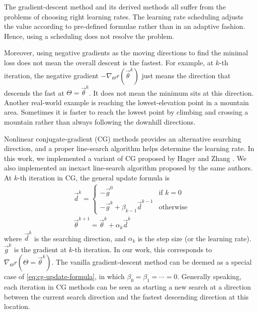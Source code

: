 
The gradient-descent method and its derived methods all suffer from the problems of choosing right learning rates.
The learning rate scheduling adjusts the value according to pre-defined formulae rather than in an adaptive fashion.
Hence, using a scheduling does not resolve the problem.

Moreover, using negative gradients as the moving directions to find the minimal loss does not mean the overall descent is the fastest.
For example, at $k$-th iteration, the negative gradient $- \nabla_{\Theta} r(\vec{\theta}^k)$ just means the direction that descends the fast at $\Theta=\vec{\theta}^k$.
It does not mean the minimum sits at this direction.
Another real-world example is reaching the lowest-elevation point in a mountain area.
Sometimes it is faster to reach the lowest point by climbing and crossing a mountain rather than always following the downhill directions.

Nonlinear conjugate-gradient (CG) methods provides an alternative searching direction, and a proper line-search algorithm helps determine the learning rate.
In this work, we implemented a variant of CG proposed by Hager and Zhang \cite{hager_new_2005,hager_survey_2006,hager_algorithm_2006}.
We also implemented an inexact line-search algorithm proposed by the same authors.
At $k$-th iteration in CG, the general update formula is
\begin{equation}\label{eq:cg-update-formula}
    \begin{aligned}
        &\vec{d}^k = 
        \left\{
            \begin{array}{ll}
                -\vec{g}^0 & \text{if\ }k = 0 \\
                -\vec{g}^k + \beta_{k-1}\vec{d}^{k-1} & \text{otherwise}
            \end{array}
        \right. \\
        &\vec{\theta}^{k+1} = \vec{\theta}^k + \alpha_k \vec{d}^k
    \end{aligned}
\end{equation}
where $\vec{d}^k$ is the searching direction, and $\alpha_k$ is the step size (or the learning rate).
$\vec{g}^k$ is the gradient at $k$-th iteration.
In our work, this corresponds to $\nabla_{\Theta} r(\Theta=\vec{\theta}^k)$.
The vanilla gradient-descent method can be deemed as a special case of \eqref{eq:cg-update-formula}, in which $\beta_0=\beta_1=\cdots=0$.
Generally speaking, each iteration in CG methods can be seen as starting a new search at a direction between the current search direction and the fastest descending direction at this location.

